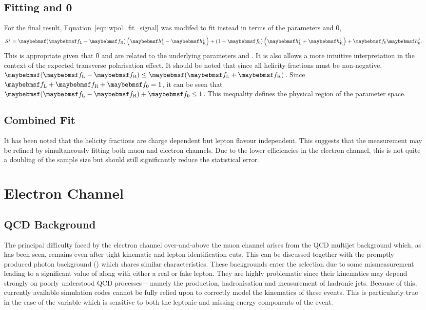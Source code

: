 \subsection{Fitting \fLmfR and \f0}
\label{sec:wpol_fit_fmfr}
For the final result, Equation~\ref{eqn:wpol_fit_signal} was modifed to fit
instead in terms of the parameters \fLmfR and \f0,
\begin{equation*}
S^j = \fLmfR \left (\hLj -\hRj\right) + \left(1-\f0\right)\left(\hLj +\hRj\right) +\f0\hZj.
\end{equation*}
This is appropriate given that \f0 and \fLmfR are related to the underlying
parameters \Azero and \Afour. It is also allows a more intuitive interpretation
in the context of the expected transverse polarisation effect. It should be
noted that since all helicity fractions must be non-negative,
$\fLmfR\leq\fLpfR$. Since $\fL +\fR + \f0 = 1$, it can be seen that $\fLmfR +
\f0 \leq 1$. This inequality defines the physical region of the parameter space.

\subsection{Combined Fit}
It has been noted that the helicity fractions are charge dependent but lepton
flavour independent. This suggests that the measurement may be refined by
simultaneously fitting both muon and electron channels. Due to the lower
efficiencies in the electron channel, this is not quite a doubling of the sample
size but should still significantly reduce the statistical error.

\section{Electron Channel}
\subsection{\ac{QCD} Background}
The principal difficulty faced by the electron channel over-and-above the muon
channel arises from the \ac{QCD} multijet background which, as has been seen,
remains even after tight kinematic and lepton identification cuts. This can be
discussed together with the promptly produced photon background (\gammajets)
which shares similar characteristics. These backgrounds enter the selection due
to some mismeasurement leading to a significant value of \PtW along with either
a real or fake lepton. They are highly problematic since their kinematics may
depend strongly on poorly understood \ac{QCD} processes -- namely the production,
hadronisation and measurement of hadronic jets. Because of this, currently
available simulation codes cannot be fully relied upon to correctly model the
kinematics of these events. This is particularly true in the case of the \LP
variable which is sensitive to both the leptonic and missing energy components
of the event.


